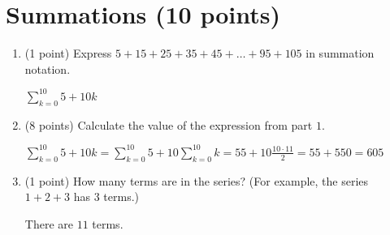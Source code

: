 \documentclass[11pt]{article}
\newcounter{pgpts}
\newcounter{cumpts}
\newcommand{\cnewpage}{\addtocounter{cumpts}{\value{pgpts}}\newpage\setcounter{pgpts}{0}}
\begin{document}
\cnewpage
\section{Summations (10 points)}\addtocounter{pgpts}{10}
\begin{enumerate}
    \item (1 point) Express $5+15+25+35+45+\dots+95+105$ in summation notation.
    
    \vspace{1cm}
    $\sum_{k=0}^{10} 5+10k$
    
    \vspace{2cm}
    \item (8 points) Calculate the value of the expression from part $1$.
    
    \vspace{1cm}
    $\sum_{k=0}^{10} 5+10k= \sum_{k=0}^{10} 5 +10\sum_{k=0}^{10} k = 55+10\frac{10 \cdot 11}{2} = 55+550 = 605$
    \vspace{2cm}
    \item (1 point) How many terms are in the series? (For example, the series $1+2+3$ has $3$ terms.)
    \vspace{2cm}

    There are $11$ terms.
\end{enumerate}









\cnewpage
\end{document}
